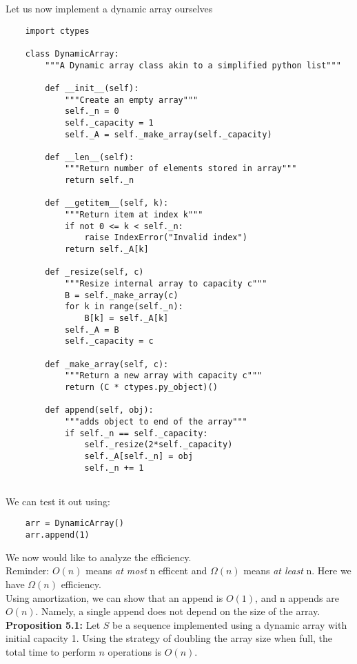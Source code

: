 \documentclass[]{article}
\begin{document}
Let us now implement a dynamic array ourselves

\begin{lstlisting}
	import ctypes
	
	class DynamicArray:
		"""A Dynamic array class akin to a simplified python list"""
		
		def __init__(self):
			"""Create an empty array"""
			self._n = 0
			self._capacity = 1
			self._A = self._make_array(self._capacity)
			
		def __len__(self):
			"""Return number of elements stored in array"""	
			return self._n
			
		def __getitem__(self, k):
			"""Return item at index k"""
			if not 0 <= k < self._n:
				raise IndexError("Invalid index")
			return self._A[k]
		
		def _resize(self, c)
			"""Resize internal array to capacity c"""
			B = self._make_array(c)
			for k in range(self._n):
				B[k] = self._A[k]
			self._A = B
			self._capacity = c
		
		def _make_array(self, c):
			"""Return a new array with capacity c"""
			return (C * ctypes.py_object)()
		
		def append(self, obj):
			"""adds object to end of the array"""
			if self._n == self._capacity:
				self._resize(2*self._capacity)
				self._A[self._n] = obj
				self._n += 1
		
\end{lstlisting}\bigbreak
 
We can test it out using:

\begin{lstlisting}
	arr = DynamicArray()
	arr.append(1)
\end{lstlisting}\bigbreak

We now would like to analyze the efficiency.\\

Reminder: $O(n)$ means \textit{at most} n efficent and $\Omega(n)$ means \textit{at least} n. Here we have $\Omega(n)$ efficiency.\\

Using amortization, we can show that an append is $O(1)$, and n appends are $O(n)$. Namely, a single append does not depend on the size of the array. \\

\textbf{Proposition 5.1:} Let $S$ be a sequence implemented using a dynamic array with initial capacity 1. Using the strategy of doubling the array size when full, the total time to perform $n$ operations is $O(n)$. \\
\end{document}
